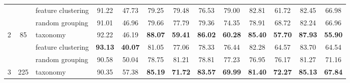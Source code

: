 \documentclass[final]{cvpr}
\begin{document}
\begin{table*}[t]
{\begin{tabular}{c|c|l|cc|cc|cc|cc|cc}
                                &                                                                                        & feature clustering                                                                                          & 91.22                & 47.73                 & 79.25                & 79.48                 & 76.53                & 79.00                 & 82.81                & 61.72                 & 82.45                & 66.98                \\
                                &                                                                                        & random grouping                                                                                             & 91.01                & 46.96                 & 79.66                & 77.79                 & 79.36                & 74.35                 & 78.91                & 68.72                 & 82.24                & 66.96                \\ \midrule
\multirow{3}{*}{2}              & \multirow{3}{*}{85}                                                                    & taxonomy                                                                                                    & 92.22                & 46.19                 & \textbf{88.07}       & \textbf{59.41}        & \textbf{86.02}       & \textbf{60.28}        & \textbf{85.40}       & \textbf{57.70}        & \textbf{87.93}       & \textbf{55.90}       \\
                                &                                                                                        & feature clustering                                                                                          & \textbf{93.13}       & \textbf{40.07}        & 81.05                & 77.06                 & 78.33                & 76.44                 & 82.28                & 64.57                 & 83.70                & 64.54                \\
                                &                                                                                        & random grouping                                                                                             & 90.58                & 50.04                 & 78.75                & 81.21                 & 78.81                & 77.23                 & 76.95                & 76.17                 & 81.27                & 71.16                \\ \midrule
\multirow{3}{*}{3}              & \multirow{3}{*}{225}                                                                   & taxonomy                                                                                                    & 90.35                & 57.38                 & \textbf{85.19}       & \textbf{71.72}        & \textbf{83.57}       & \textbf{69.99}        & \textbf{81.40}       & \textbf{72.27}        & \textbf{85.13}       & \textbf{67.84}       \\

\end{tabular}}
\end{table*}
\end{document}
